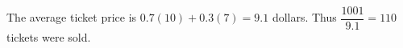 The average ticket price is $0.7(10)+0.3(7)=9.1$ dollars. Thus $\dfrac{1001}{9.1}=\boxed{110}$ tickets were sold.
